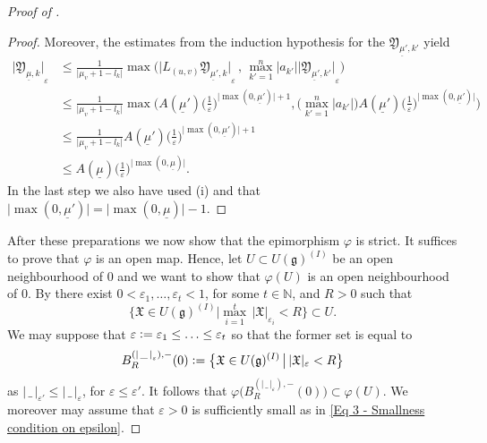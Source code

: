 \documentclass[a4paper, reqno, 10pt]{amsart}
\theoremstyle{definition}
\numberwithin{equation}{section}
\newcommand{\abs}[1]{{\lvert{#1}\rvert}}
\newcommand{\blank}{{\,\_\,}}
\newcommand{\defeq}{\vcentcolon=}
\newcommand{\ul}[1]{{\underline{#1}}}
\newcommand{\BN}{{\mathbb {N}}}
\newcommand{\Fg}{{\mathfrak {g}}}
\newcommand{\FX}{{\mathfrak {X}}}
\newcommand{\FY}{{\mathfrak {Y}}}
\begin{document}
\begin{proof}[{Proof of }]
\begin{proof}
	Moreover, the estimates from the induction hypothesis for the $\FY_{\ul{\mu}',k'}$ yield
	\begin{align*}
		\abs{\FY_{\ul{\mu},k}}_\varepsilon 
			&\leq \frac{1}{\abs{\mu_v +1 - l_k}} \max \Big( \abs{L_{(u,v)} \FY_{\ul{\mu}',k} }_\varepsilon \,,\, \max_{k'=1}^n \abs{a_{k'}} \abs{ \FY_{\ul{\mu}',k'}}_\varepsilon \Big) \\
			&\leq \frac{1}{\abs{\mu_v +1 - l_k}} \max \Bigg( A(\ul{\mu}') \bigg(\frac{1}{\varepsilon}\bigg)^{\abs{\max(0,\ul{\mu}')}+1} , \Big( \max_{k'=1}^n \abs{a_{k'}} \Big) A(\ul{\mu}') \bigg(\frac{1}{\varepsilon}\bigg)^{\abs{\max(0,\ul{\mu}')}} \Bigg) \\
			&\leq \frac{1}{\abs{\mu_v +1 - l_k}} A(\ul{\mu}') \bigg(\frac{1}{\varepsilon}\bigg)^{\abs{\max(0,\ul{\mu}')}+1} \\
			&\leq A(\ul{\mu}) \bigg(\frac{1}{\varepsilon}\bigg)^{\abs{\max(0,\ul{\mu})}} .
	\end{align*}
	In the last step we also have used  (i) and that $\abs{\max(0,\ul{\mu}')} = \abs{\max(0,\ul{\mu})} - 1$.	
\end{proof}


	After these preparations we now show that the epimorphism $\varphi$ is strict.
	It suffices to prove that $\varphi$ is an open map.
	Hence, let $U \subset U(\Fg)^{(I)}$ be an open neighbourhood of $0$ and we want to show that $\varphi(U)$ is an open neighbourhood of $0$.
	By \cite[Thm.\ 3.3.6]{PerezGarciaSchikhof10LocConvSpNonArch} there exist $0<\varepsilon_1 ,\ldots, \varepsilon_t < 1$, for some $t\in \BN$, and $R>0$ such that
	\begin{equation*}
		\big\{ \FX\in U(\Fg)^{(I)} \big\vert \max_{i=1}^t \, \lvert \FX \rvert_{\varepsilon_i} < R \big\} \subset U .
	\end{equation*}
	We may suppose that $\varepsilon \defeq \varepsilon_1 \leq \ldots \leq \varepsilon_t$ so that the former set is equal to 
	\begin{equation*}
		B^{(\abs{\blank}_\varepsilon),-}_R (0) \defeq \big\{ \FX \in U(\Fg)^{(I)} \,\big\vert\, \lvert \FX \rvert_{\varepsilon} < R \big\}
	\end{equation*}
	as $\lvert \blank \rvert_{\varepsilon'} \leq \lvert\blank\rvert_{\varepsilon}$, for $\varepsilon \leq \varepsilon'$.
	It follows that $\varphi\big( B^{(\abs{\blank}_\varepsilon),-}_R (0) \big) \subset \varphi ( U ) $.
	We moreover may assume that $\varepsilon>0$ is sufficiently small as in \eqref{Eq 3 - Smallness condition on epsilon}.
	

\end{proof}
\end{document}
